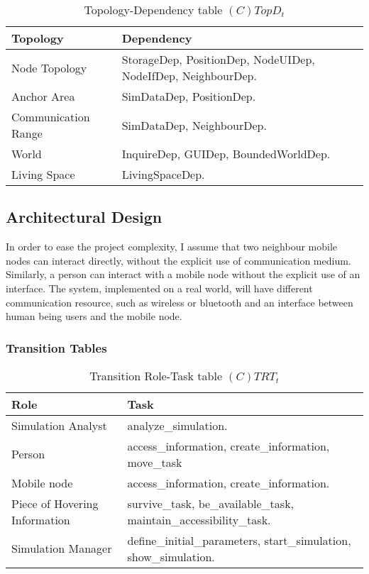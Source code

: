 \begin{table}[H]
	\centering
	\begin{tabular}{|p{4cm}|p{8cm}|}
			\hline
			\textbf{Topology} & \textbf{Dependency} \\
			\hline
			Node Topology & StorageDep, PositionDep, NodeUIDep, NodeIfDep, NeighbourDep. \\
			\hline
			Anchor Area & SimDataDep, PositionDep.\\
			\hline
			Communication Range & SimDataDep, NeighbourDep. \\
			\hline
			World & InquireDep, GUIDep, BoundedWorldDep. \\
			\hline
			Living Space & LivingSpaceDep. \\
			\hline
		\end{tabular}
	\caption{Topology-Dependency table $(C)TopD_t$}
	\label{tab:ctopdt}
\end{table}

\subsection{Architectural Design}

In order to ease the project complexity, I assume that two neighbour mobile
nodes can interact directly, without the explicit use of communication medium.
Similarly, a person can interact with a mobile node without the explicit use of
an interface. The system, implemented on a real world, will have different
communication resource, such as wireless or bluetooth and an interface between
human being users and the mobile node.

\subsubsection{Transition Tables}

\begin{table}[H]
	\centering
	\begin{tabular}{|p{4cm}|p{8cm}|}
			\hline
			\textbf{Role} & \textbf{Task} \\
			\hline
			Simulation Analyst & analyze\_simulation.   \\
			\hline
			Person & access\_information, create\_information, move\_task \\
			\hline
			Mobile node & access\_information, create\_information.  \\
			\hline
			Piece of Hovering Information & survive\_task, be\_available\_task,
			maintain\_accessibility\_task. \\
			\hline
			Simulation Manager & define\_initial\_parameters, start\_simulation,
			show\_simulation. \\
			\hline
		\end{tabular}
	\caption{Transition Role-Task table $(C)TRT_t$}
	\label{tab:ctrtt}
\end{table}

